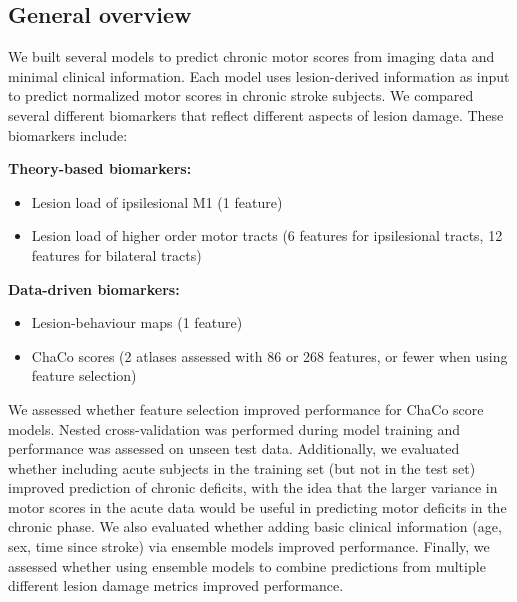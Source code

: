 \documentclass[10pt]{article}
\begin{document}
\subsection{General overview}

We built several models to predict chronic motor scores from imaging data and minimal clinical information. Each model uses lesion-derived information as input to predict normalized motor scores in chronic stroke subjects. We compared several different biomarkers that reflect different aspects of lesion damage. These biomarkers include:


\textbf{Theory-based biomarkers:}
\begin{itemize}
\item Lesion load of ipsilesional M1 (1 feature)
\item Lesion load of higher order motor tracts (6 features for ipsilesional tracts, 12 features for bilateral tracts)
\end{itemize}

\textbf{Data-driven biomarkers:}
\begin{itemize}
\item Lesion-behaviour maps (1 feature)
\item ChaCo scores (2 atlases assessed with 86 or 268 features, or fewer when using feature selection)
\end{itemize}

We assessed whether feature selection improved performance for ChaCo score models. Nested cross-validation was performed during model training and performance was assessed on unseen test data.  Additionally, we evaluated whether including acute subjects in the training set (but not in the test set) improved prediction of chronic deficits, with the idea that the larger variance in motor scores in the acute data would be useful in predicting motor deficits in the chronic phase. We also evaluated whether adding basic clinical information (age, sex, time since stroke) via ensemble models improved performance. Finally, we assessed whether using ensemble models to combine predictions from multiple different lesion damage metrics improved performance.
\end{document}

